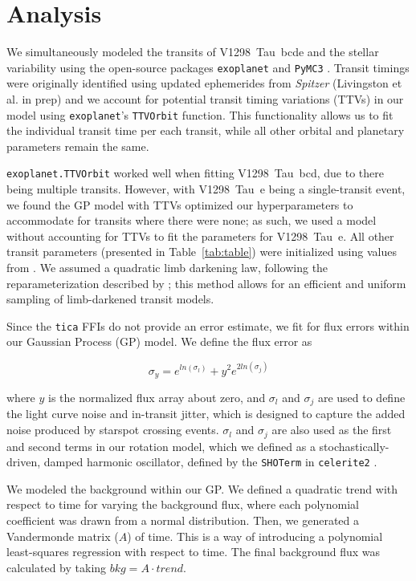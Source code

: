 \documentclass[twocolumn]{aastex631}
\newcommand{\allplanets}{V1298~Tau~bcde\xspace}
\newcommand{\planete}{V1298~Tau~e\xspace}
\newcommand{\planetknown}{V1298~Tau~bcd\xspace}
\newcommand{\exoplanet}{\texttt{exoplanet}\xspace}
\begin{document}
\section{Analysis} \label{sec:analysis}

We simultaneously modeled the transits of \allplanets and the stellar variability using the open-source packages \exoplanet \citep{exoplanet2019, exoplanet2021} and \texttt{PyMC3} \citep{Salvatier16}. Transit timings were originally identified using updated ephemerides from \textit{Spitzer} (Livingston et al. in prep) and we account for potential transit timing variations (TTVs) in our model using \texttt{exoplanet}'s \texttt{TTVOrbit} function. This functionality allows us to fit the individual transit time per each transit, while all other orbital and planetary parameters remain the same.

\texttt{exoplanet.TTVOrbit} worked well when fitting \planetknown, due to there being multiple transits. However, with \planete being a single-transit event, we found the GP model with TTVs optimized our hyperparameters to accommodate for transits where there were none; as such, we used a model without accounting for TTVs to fit the parameters for \planete. All other transit parameters (presented in Table~\ref{tab:table}) were initialized using values from \cite{David2019a}. We assumed a quadratic limb darkening law, following the reparameterization described by \cite{kipping13}; this method allows for an efficient and uniform sampling of limb-darkened transit models.


Since the \texttt{tica} FFIs do not provide an error estimate, we fit for flux errors within our Gaussian Process (GP) model. We define the flux error as

\begin{equation}
    \sigma_y = e^{ln(\sigma_l)} + y^2 e^{2 ln(\sigma_j)}
\end{equation}

where $y$ is the normalized flux array about zero, and $\sigma_l$  and $\sigma_j$ are used to define the light curve noise and in-transit jitter, which is designed to capture the added noise produced by starspot crossing events. $\sigma_l$  and $\sigma_j$ are also used as the first and second terms in our rotation model, which we defined as a stochastically-driven, damped harmonic oscillator, defined by the \texttt{SHOTerm} in \texttt{celerite2} \citep{dfm17}.

We modeled the background within our GP. We defined a quadratic trend with respect to time for varying the background flux, where each polynomial coefficient was drawn from a normal distribution. Then, we generated a Vandermonde matrix ($A$) of time. This is a way of introducing a polynomial least-squares regression with respect to time. The final background flux was calculated by taking $bkg = A \cdot trend$.  
\end{document}
